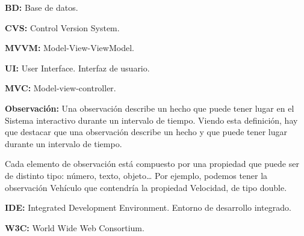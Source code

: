 \textbf{BD:} Base de datos.

\textbf{CVS:} Control Version System.

\textbf{MVVM:} Model-View-ViewModel.

\textbf{UI:} User Interface. Interfaz de usuario.

\textbf{MVC:} Model-view-controller.

\textbf{Observaci\'{o}n:} Una observación describe un hecho que puede tener lugar en el Sistema interactivo 
durante un intervalo de tiempo. Viendo esta definición, hay que destacar que una
observación describe un hecho y que puede tener lugar durante un intervalo de
tiempo.

Cada elemento de observación está compuesto por una propiedad que puede ser de
distinto tipo: número, texto, objeto… Por ejemplo, podemos tener la observación
Vehículo que contendría la propiedad Velocidad, de tipo double. \cite{INTRASIM:manual}

\textbf{IDE:} Integrated Development Environment. Entorno de desarrollo integrado.

\textbf{W3C:} World Wide Web Consortium.
 
